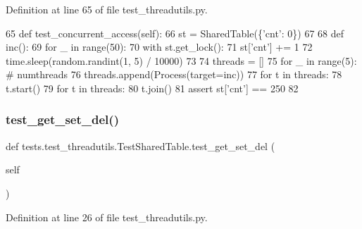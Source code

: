 Definition at line 65 of file test\+\_\+threadutils.\+py.


\begin{DoxyCode}
65     \textcolor{keyword}{def }test\_concurrent\_access(self):
66         st = SharedTable(\{\textcolor{stringliteral}{'cnt'}: 0\})
67 
68         \textcolor{keyword}{def }inc():
69             \textcolor{keywordflow}{for} \_ \textcolor{keywordflow}{in} range(50):
70                 with st.get\_lock():
71                     st[\textcolor{stringliteral}{'cnt'}] += 1
72                 time.sleep(random.randint(1, 5) / 10000)
73 
74         threads = []
75         \textcolor{keywordflow}{for} \_ \textcolor{keywordflow}{in} range(5):  \textcolor{comment}{# numthreads}
76             threads.append(Process(target=inc))
77         \textcolor{keywordflow}{for} t \textcolor{keywordflow}{in} threads:
78             t.start()
79         \textcolor{keywordflow}{for} t \textcolor{keywordflow}{in} threads:
80             t.join()
81         \textcolor{keyword}{assert} st[\textcolor{stringliteral}{'cnt'}] == 250
82 
\end{DoxyCode}
\mbox{\label{classtests_1_1test__threadutils_1_1TestSharedTable_a5afcb2be145212a9d06f2f2ecd45da68}} 
\subsubsection{\texorpdfstring{test\+\_\+get\+\_\+set\+\_\+del()}{test\_get\_set\_del()}}
{\footnotesize\ttfamily def tests.\+test\+\_\+threadutils.\+Test\+Shared\+Table.\+test\+\_\+get\+\_\+set\+\_\+del (\begin{DoxyParamCaption}\item[{}]{self }\end{DoxyParamCaption})}



Definition at line 26 of file test\+\_\+threadutils.\+py.


